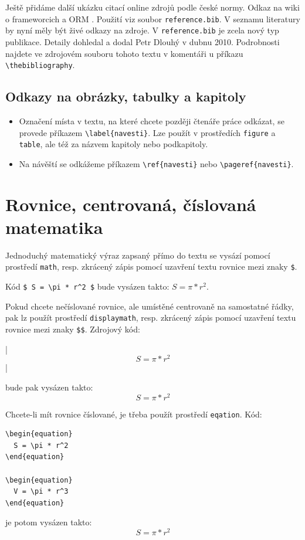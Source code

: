 \documentclass[11pt,twoside,a4paper]{book}
\begin{document}
Ještě přidáme další ukázku citací online zdrojů podle české normy. Odkaz na wiki o frameworcich
\cite{wiki:framework} a ORM \cite{wiki:orm}. Použití viz soubor \verb|reference.bib|. V seznamu literatury by
nyní měly být živé odkazy na zdroje. V \verb|reference.bib| je zcela nový typ publikace. Detaily dohledal a
dodal Petr Dlouhý v dubnu 2010. Podrobnosti najdete ve zdrojovém souboru tohoto textu v komentáři u příkazu
\verb|\thebibliography|.

\subsection{Odkazy na obrázky, tabulky a kapitoly}
\begin{itemize}
\item Označení místa v textu, na které chcete později čtenáře práce odkázat, se provede příkazem
\verb|\label{navesti}|. Lze použít v prostředích \verb|figure| a  \verb|table|, ale též za názvem kapitoly
nebo podkapitoly.
\item Na návěští se odkážeme příkazem \verb|\ref{navesti}| nebo \verb|\pageref{navesti}|.
\end{itemize}

\section{Rovnice, centrovaná, číslovaná matematika}
Jednoduchý matematický výraz zapsaný přímo do textu se vysází pomocí prostředí \verb|math|, resp. zkrácený
zápis pomocí uzavření textu rovnice mezi znaky \verb|$|.

Kód \verb|$ S = \pi * r^2 $| bude vysázen takto: $ S = \pi * r^2 $.

Pokud chcete nečíslované rovnice, ale umístěné centrovaně na samostatné řádky, pak lz  použít prostředí
\verb|displaymath|, resp. zkrácený zápis pomocí uzavření textu rovnice mezi znaky \verb|$$|. Zdrojový kód:
\begin{verb}
|$$ S = \pi * r^2 $$|
\end{verb}
bude pak vysázen takto:
$$ S = \pi * r^2 $$

Chcete-li mít rovnice číslované, je třeba použít prostředí \verb|eqation|. Kód:
\begin{verbatim}
\begin{equation}
  S = \pi * r^2
\end{equation}

\begin{equation}
  V = \pi * r^3
\end{equation}
\end{verbatim}
je potom vysázen takto:
\begin{equation}
  S = \pi * r^2
\end{equation}
\end{document}
